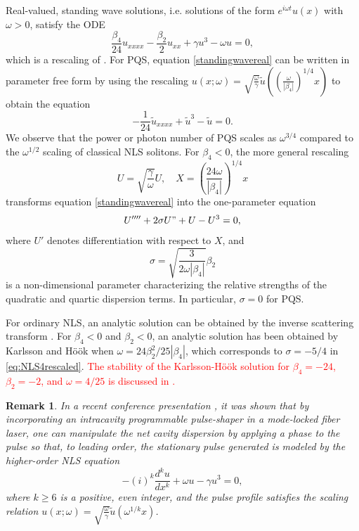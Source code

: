 \documentclass[12pt]{elsarticle}
\newtheorem{remark}{Remark}
\newcommand{\revised}[1]{ \textcolor{red}{#1} }
\begin{document}
Real-valued, standing wave solutions, i.e. solutions of the form $e^{i \omega t} u(x)$ with $\omega > 0$, satisfy the ODE 
\begin{equation}\label{standingwavereal}
\frac{\beta_4}{24}u_{xxxx} - \frac{\beta_2}{2}u_{xx} + \gamma u^3 - \omega u = 0,
\end{equation}
which is a rescaling of \cite{champneys1998}. For PQS, equation \cref{standingwavereal} can be written in parameter free form by using the rescaling $
u(x; \omega) = \sqrt{\frac{\omega}{\gamma}} \tilde{u}
\left( \left(\frac{\omega}{|\beta_4|}\right)^{1/4}x \right)
$
to obtain the equation
\begin{equation}\label{PQSparfree}
-\frac{1}{24}\tilde{u}_{xxxx} + \tilde{u}^3 - \tilde{u} = 0.
\end{equation} 
We observe that the power or photon number of PQS scales as $\omega^{3/4}$ compared to the $\omega^{1/2}$ scaling of classical NLS solitons. For $\beta_4 < 0$, the more general rescaling \cite[Section VI]{Tam2020} 
\begin{equation}\label{rescaling}
U = \sqrt{\frac{\gamma}{\omega}} U, \quad
X = \left( \frac{24 \omega}{|\beta_4|}\right)^{1/4} x
\end{equation}
transforms equation \cref{standingwavereal} into the one-parameter equation
\begin{equation}\label{eq:NLS4rescaled}
U'''' + 2 \sigma U" +  U - U^3 = 0,
\end{equation}
where $U'$ denotes differentiation with respect to $X$, and 
\begin{equation}\label{eq:sigma}
\sigma = \sqrt{\frac{3}{2 \omega |\beta_4| }}\beta_2
\end{equation}
is a non-dimensional parameter characterizing the relative strengths of the quadratic and quartic dispersion terms. In particular, $\sigma = 0$ for PQS.

For ordinary NLS, an analytic solution can be obtained by the inverse scattering transform \cite{Zak72}. For $\beta_4 < 0$ and $\beta_2 < 0$, an analytic solution has been obtained by Karlsson and H{\"o}{\"o}k \cite{KarllsonHook} when $\omega = 24 \beta_2^2 / 25 |\beta_4|$, which corresponds to $\sigma = -5/4$ in \cref{eq:NLS4rescaled}. \revised{The stability of the Karlsson-H{\"o}{\"o}k solution for $\beta_4 = -24$, $\beta_2 = -2$, and $\omega = 4/25$ is discussed in \cite{Natali2015}.}

\begin{remark}
In a recent conference presentation \cite{Runge2020}, it was shown that by incorporating an intracavity programmable pulse-shaper in a mode-locked fiber laser, one can manipulate the net cavity dispersion by applying a phase to the pulse so that, to leading order, the stationary pulse generated is modeled by the higher-order NLS equation
\begin{equation}\label{HONLS}
-(i)^k\frac{d^k u}{dx^k}+ \omega u - \gamma u^3 = 0,
\end{equation}
where $k \geq 6$ is a positive, even integer, and the pulse profile satisfies the scaling relation $u(x; \omega) = \sqrt{\frac{\omega}{\gamma}}\tilde{u}(\omega^{1/k}x)$.
\end{remark}
\end{document}
